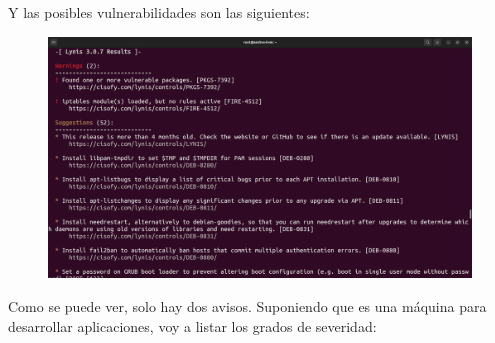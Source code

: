 \documentclass{article}
\begin{document}
\bigskip

Y las posibles vulnerabilidades son las siguientes:

\begin{figure}[H]
    \includegraphics[width=\textwidth]{imagenes/lyniswarnings1.png}
\end{figure}

\newpage

Como se puede ver, solo hay dos avisos. Suponiendo que es una máquina para desarrollar aplicaciones, voy a listar los grados de severidad:
\end{document}
